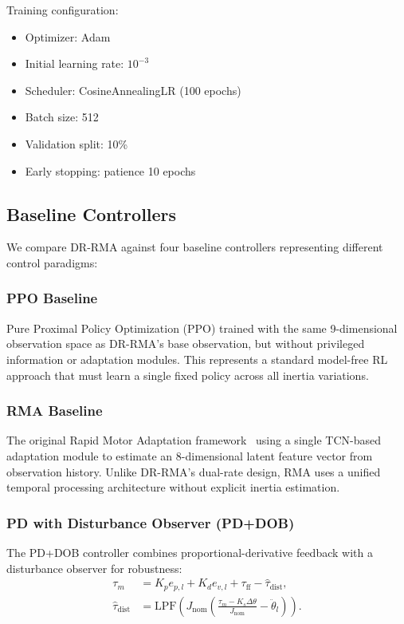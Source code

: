 \documentclass[lettersize,journal]{IEEEtran}
\begin{document}
Training configuration:
\begin{itemize}
\item Optimizer: Adam
\item Initial learning rate: $10^{-3}$
\item Scheduler: CosineAnnealingLR (100 epochs)
\item Batch size: 512
\item Validation split: 10\%
\item Early stopping: patience 10 epochs
\end{itemize}

\subsection{Baseline Controllers}

We compare DR-RMA against four baseline controllers representing different control paradigms:

\subsubsection{PPO Baseline}

Pure Proximal Policy Optimization (PPO) trained with the same 9-dimensional observation space as DR-RMA's base observation, but without privileged information or adaptation modules. This represents a standard model-free RL approach that must learn a single fixed policy across all inertia variations.

\subsubsection{RMA Baseline}

The original Rapid Motor Adaptation framework~\cite{kumar2021RMA} using a single TCN-based adaptation module to estimate an 8-dimensional latent feature vector from observation history. Unlike DR-RMA's dual-rate design, RMA uses a unified temporal processing architecture without explicit inertia estimation.

\subsubsection{PD with Disturbance Observer (PD+DOB)}

The PD+DOB controller combines proportional-derivative feedback with a disturbance observer for robustness:
\begin{equation}
\begin{aligned}
\tau_m &= K_p e_{p,l} + K_d e_{v,l} + \tau_{\text{ff}} - \hat{\tau}_{\text{dist}}, \\
\hat{\tau}_{\text{dist}} &= \text{LPF}\left(J_{\text{nom}} \left(\frac{\tau_m - K_s \Delta\theta}{J_{\text{nom}}} - \ddot{\theta}_l\right)\right).
\end{aligned}
\label{eq:pddob_control}
\end{equation}
\end{document}
